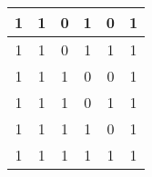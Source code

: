 \begin{center}
\begin{table}[h]
\begin{center}
\begin{tabular}{|c|c|c|c|c||c|}
            1  & 1  & 0 & 1 & 0 & 1 \\ \hline
            1  & 1  & 0 & 1 & 1 & 1 \\ \hline
            1  & 1  & 1 & 0 & 0 & 1 \\ \hline
            1  & 1  & 1 & 0 & 1 & 1 \\ \hline
            1  & 1  & 1 & 1 & 0 & 1 \\ \hline
            1  & 1  & 1 & 1 & 1 & 1 \\ \hline
            \end{tabular}
        \end{center}
    \end{table}
\end{center}
